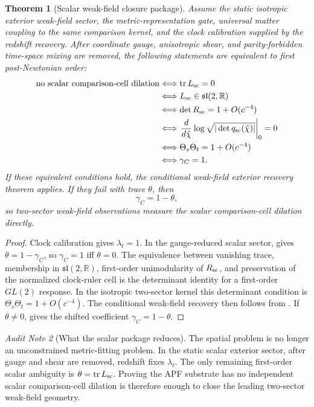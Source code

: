 \documentclass[11pt]{article}
\newtheorem{theorem}{Theorem}[section]
\theoremstyle{remark}
\newtheorem{audit}[theorem]{Audit Note}
\begin{document}
\begin{theorem}[Scalar weak-field closure package]
\label{thm:scalar-closure-package}
Assume the static isotropic exterior weak-field sector, the metric-representation gate, universal matter coupling to the same comparison kernel, and the clock calibration supplied by the redshift recovery.  After coordinate gauge, anisotropic shear, and parity-forbidden time-space mixing are removed, the following statements are equivalent to first post-Newtonian order:
\[
\begin{aligned}
        \text{no scalar comparison-cell dilation}
        &\Longleftrightarrow
        \operatorname{tr}L_{\rm sc}=0 \\
        &\Longleftrightarrow
        L_{\rm sc}\in\mathfrak{sl}(2,\mathbb R) \\
        &\Longleftrightarrow
        \det R_{\rm sc}=1+O(c^{-4}) \\
        &\Longleftrightarrow
        \left.\dfrac{d}{d\hat\chi}
        \log\sqrt{|\det q_{\rm sc}(\hat\chi)|}\right|_{0}=0 \\
        &\Longleftrightarrow
        \Theta_s\Theta_t=1+O(c^{-4}) \\
        &\Longleftrightarrow
        \gamma_C=1.
\end{aligned}
\]
If these equivalent conditions hold, the conditional weak-field exterior recovery theorem applies.  If they fail with trace \(\theta\), then
\[
        \gamma_C=1-\theta,
\]
so two-sector weak-field observations measure the scalar comparison-cell dilation directly.
\end{theorem}

\begin{proof}
Clock calibration gives \(\lambda_t=1\).  In the gauge-reduced scalar sector,  gives \(\theta=1-\gamma_C\), so \(\gamma_C=1\) iff \(\theta=0\).  The equivalence between vanishing trace, membership in \(\mathfrak{sl}(2,\mathbb R)\), first-order unimodularity of \(R_{\rm sc}\), and preservation of the normalized clock-ruler cell is the determinant identity for a first-order \(GL(2)\) response.  In the isotropic two-sector kernel this determinant condition is \(\Theta_s\Theta_t=1+O(c^{-4})\).  The conditional weak-field recovery then follows from .  If \(\theta\neq0\),  gives the shifted coefficient \(\gamma_C=1-\theta\).
\end{proof}

\begin{audit}[What the scalar package reduces]
The spatial problem is no longer an unconstrained metric-fitting problem.  In the static scalar exterior sector, after gauge and shear are removed, redshift fixes \(\lambda_t\).  The only remaining first-order scalar ambiguity is \(\theta=\operatorname{tr}L_{\rm sc}\).  Proving the APF substrate has no independent scalar comparison-cell dilation is therefore enough to close the leading two-sector weak-field geometry.
\end{audit}
\end{document}
